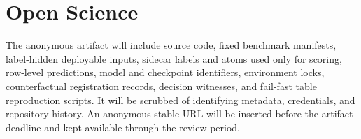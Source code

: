 \section{Open Science}

The anonymous artifact will include source code, fixed benchmark manifests, label-hidden deployable inputs, sidecar labels and atoms used only for scoring, row-level predictions, model and checkpoint identifiers, environment locks, counterfactual registration records, decision witnesses, and fail-fast table reproduction scripts. It will be scrubbed of identifying metadata, credentials, and repository history. An anonymous stable URL will be inserted before the artifact deadline and kept available through the review period.
